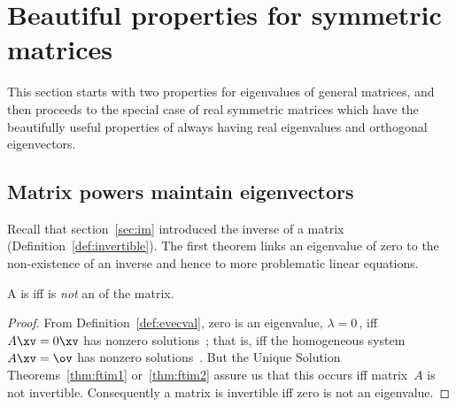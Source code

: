 

\section{Beautiful properties for symmetric matrices}
\label{sec:sm}
\secttoc

\begin{comment}
\pooliv{\S5.4} \layiv{\S7.1} \holti{\S8.3} \cite[\S10]{Davis99a}
\end{comment}



This section starts with two properties for eigenvalues of general matrices, and then proceeds to the special case of real symmetric  matrices which have the beautifully useful properties of always having real eigenvalues and orthogonal eigenvectors.



\subsection{Matrix powers maintain eigenvectors}
\label{sec:mpmev}

Recall that section~\ref{sec:im} introduced the inverse of a matrix (Definition~\ref{def:invertible}).
The first theorem links an eigenvalue of zero to the non-existence of an inverse and hence to more problematic linear equations.


\begin{theorem} \label{thm:evalinv} 
A  is  iff  is \emph{not} an  of the matrix.
\end{theorem}
\begin{proof} 
From Definition~\ref{def:evecval}, zero is an eigenvalue, \(\lambda=0\)\,, iff \(A\xv=0\xv\) has nonzero solutions~\xv; that is, iff the homogeneous system \(A\xv=\ov\) has nonzero solutions~\xv.
But the Unique Solution Theorems~\ref{thm:ftim1} or~\ref{thm:ftim2} assure us that this occurs iff matrix~\(A\) is not invertible.
Consequently a matrix is invertible iff zero is not an eigenvalue.
\end{proof}

